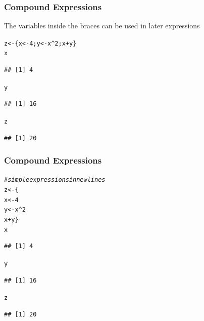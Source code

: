 \documentclass[12pt]{beamer}\usepackage[]{graphicx}\usepackage[]{color}
\makeatletter
\newcommand{\hlnum}[1]{\textcolor[rgb]{0.686,0.059,0.569}{#1}}%
\newcommand{\hlcom}[1]{\textcolor[rgb]{0.678,0.584,0.686}{\textit{#1}}}%
\newcommand{\hlopt}[1]{\textcolor[rgb]{0,0,0}{#1}}%
\newcommand{\hlstd}[1]{\textcolor[rgb]{0.345,0.345,0.345}{#1}}%
\newcommand{\hlkwb}[1]{\textcolor[rgb]{0.69,0.353,0.396}{#1}}%
\newenvironment{kframe}{%
 \def\at@end@of@kframe{}%
 \ifinner\ifhmode%
  \def\at@end@of@kframe{\end{minipage}}%
  \begin{minipage}{\columnwidth}%
 \fi\fi%
 \def\FrameCommand##1{\hskip\@totalleftmargin \hskip-\fboxsep
 \colorbox{shadecolor}{##1}\hskip-\fboxsep
     \hskip-\linewidth \hskip-\@totalleftmargin \hskip\columnwidth}%
 \MakeFramed {\advance\hsize-\width
   \@totalleftmargin\z@ \linewidth\hsize
   \@setminipage}}%
 {\par\unskip\endMakeFramed%
 \at@end@of@kframe}
\newenvironment{knitrout}{}{} %
\makeatother
\begin{document}
\begin{frame}[fragile]
\frametitle{Compound Expressions}

The variables inside the braces can be used in later expressions
\begin{knitrout}\footnotesize
{}\color{fgcolor}\begin{kframe}
\begin{alltt}
\hlstd{z} \hlkwb{<-} \hlstd{\{x} \hlkwb{<-} \hlnum{4}\hlstd{; y} \hlkwb{<-} \hlstd{x}\hlopt{^}\hlnum{2}\hlstd{; x} \hlopt{+} \hlstd{y\}}
\hlstd{x}
\end{alltt}
\begin{verbatim}
## [1] 4
\end{verbatim}
\begin{alltt}
\hlstd{y}
\end{alltt}
\begin{verbatim}
## [1] 16
\end{verbatim}
\begin{alltt}
\hlstd{z}
\end{alltt}
\begin{verbatim}
## [1] 20
\end{verbatim}
\end{kframe}
\end{knitrout}

\end{frame}


\begin{frame}[fragile]
\frametitle{Compound Expressions}

\begin{knitrout}\footnotesize
{}\color{fgcolor}\begin{kframe}
\begin{alltt}
\hlcom{# simple expressions in newlines}
\hlstd{z} \hlkwb{<-} \hlstd{\{}
  \hlstd{x} \hlkwb{<-} \hlnum{4}
  \hlstd{y} \hlkwb{<-} \hlstd{x}\hlopt{^}\hlnum{2}
  \hlstd{x} \hlopt{+} \hlstd{y\}}
\hlstd{x}
\end{alltt}
\begin{verbatim}
## [1] 4
\end{verbatim}
\begin{alltt}
\hlstd{y}
\end{alltt}
\begin{verbatim}
## [1] 16
\end{verbatim}
\begin{alltt}
\hlstd{z}
\end{alltt}
\begin{verbatim}
## [1] 20
\end{verbatim}
\end{kframe}
\end{knitrout}

\end{frame}
\end{document}
